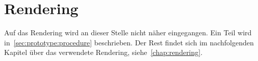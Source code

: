
\section{Rendering}
\label{sec:prototype:rendering}

Auf das Rendering wird an dieser Stelle nicht näher eingegangen. Ein Teil wird
in~\autoref{sec:prototype:procedure} beschrieben. Der Rest findet sich im
nachfolgenden Kapitel über das verwendete Rendering, siehe~\autoref{chap:rendering}.
